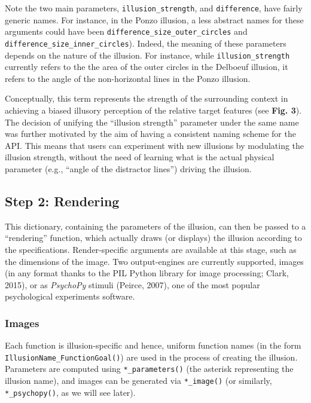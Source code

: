 \documentclass[
  english,
  man,floatsintext]{apa6}
\begin{document}
Note the two main parameters, \texttt{illusion\_strength}, and \texttt{difference}, have fairly generic names. For instance, in the Ponzo illusion, a less abstract names for these arguments could have been \texttt{difference\_size\_outer\_circles} and \texttt{difference\_size\_inner\_circles}). Indeed, the meaning of these parameters depends on the nature of the illusion. For instance, while \texttt{illusion\_strength} currently refers to the the area of the outer circles in the Delboeuf illusion, it refers to the angle of the non-horizontal lines in the Ponzo illusion.

Conceptually, this term represents the strength of the surrounding context in achieving a biased illusory perception of the relative target features (see \textbf{Fig. 3}). The decision of unifying the ``illusion strength'' parameter under the same name was further motivated by the aim of having a consistent naming scheme for the API. This means that users can experiment with new illusions by modulating the illusion strength, without the need of learning what is the actual physical parameter (e.g., ``angle of the distractor lines'') driving the illusion.

\hypertarget{step-2-rendering}{%
\subsection{Step 2: Rendering}\label{step-2-rendering}}

This dictionary, containing the parameters of the illusion, can then be passed to a ``rendering'' function, which actually draws (or displays) the illusion according to the specifications. Render-specific arguments are available at this stage, such as the dimensions of the image. Two output-engines are currently supported, images (in any format thanks to the PIL Python library for image processing; Clark, 2015), or as \emph{PsychoPy} stimuli (Peirce, 2007), one of the most popular psychological experiments software.

\hypertarget{images}{%
\subsubsection{Images}\label{images}}

Each function is illusion-specific and hence, uniform function names (in the form \texttt{IllusionName\_FunctionGoal()}) are used in the process of creating the illusion. Parameters are computed using \texttt{*\_parameters()} (the asterisk representing the illusion name), and images can be generated via \texttt{*\_image()} (or similarly, \texttt{*\_psychopy()}, as we will see later).
\end{document}
